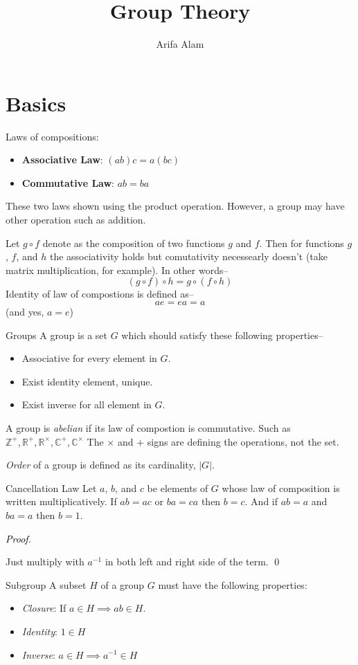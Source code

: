 \documentclass{scrartcl}
\title{Group Theory}
\author{Arifa Alam}
\newenvironment{solve}{
  \begin{solu}
    \textcolor{black}{\textit{Proof.}}
 }{

   \end{solu}
}
\begin{document}
\selectfont
\maketitle
\section{Basics}
Laws of compositions:
\begin{itemize}
	\item \textbf{Associative Law}: $(ab)c = a(bc)$
	\item \textbf{Commutative Law}: $ab = ba$
\end{itemize}

These two laws shown using the product operation. However, a group may have other operation such as addition.

Let $g \circ  f$ denote as the composition of two functions $g$ and $f$. Then for functions $g$, $f$, and $h$ the associativity holds but comutativity necessearly doesn't (take matrix multiplication, for example). In other words--
\[(g \circ f) \circ h = g \circ (f \circ h)\]
Identity of law of compostions is defined as--
\[ae = ea = a\]
(and yes, $a = e$)
\begin{definition}{Groups}{}
	A group is a set $G$ which should satisfy these following properties--
	\begin{itemize}
		\item Associative for every element in $G$.
		\item Exist identity element, unique.
		\item Exist inverse for all element in $G$.
	\end{itemize}
\end{definition}
A group is \textit{abelian} if its law of compostion is commutative. Such as $\mathbb{Z^+}, \mathbb{R^+, R^\times, C^+, C^\times}$ The $\times $ and $+$ signs are defining the operations, not the set.

\textit{Order} of a group is defined as its cardinality, $|G|$.
\begin{thm}{Cancellation Law}{}
	Let $a$, $b$, and $c$ be elements of $G$ whose law of composition is written multiplicatively. If $ab = ac$ or $ba = ca$ then $b= c$. And if $ab = a$ and $ba = a$ then $b = 1$.
\end{thm}
\begin{solve}
	Just multiply with $a^{-1}$ in both left and right side of the term. \qed
\end{solve}
\begin{definition}{Subgroup}{}
	A subset $H$ of a group $G$ must have the following properties:
	\begin{itemize}
		\item \textit{Closure}: If $a\in H \implies ab \in H$.
		\item \textit{Identity}: $1 \in H$
		\item \textit{Inverse}: $a \in H \implies a^{-1} \in H$
	\end{itemize}
\end{definition}
\end{document}
